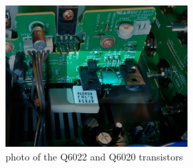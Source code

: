 \documentclass[a4paper,twoside]{report}
\begin{document}
\begin{figure}[hptb!]
 \centering
 \includegraphics[width=7cm, keepaspectratio=true]{img_report/power_amp_pcb_r.png}
 \caption{photo of the Q6022 and Q6020 transistors}
\end{figure}


\end{document}
